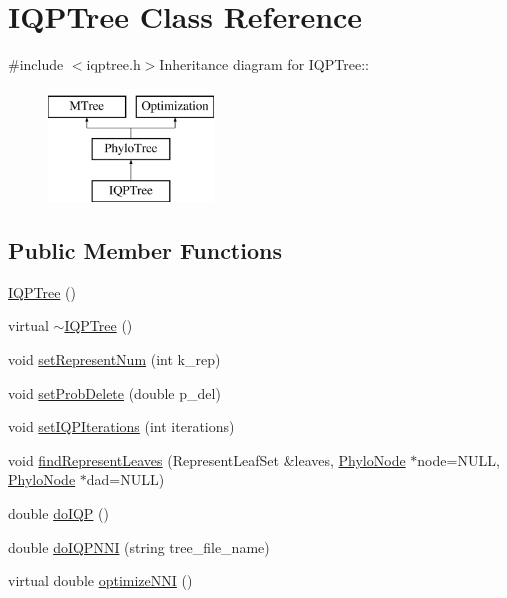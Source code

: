 \hypertarget{classIQPTree}{
\section{IQPTree Class Reference}
\label{classIQPTree}
}


{\ttfamily \#include $<$iqptree.h$>$}Inheritance diagram for IQPTree::\begin{figure}[H]
\begin{center}
\leavevmode
\includegraphics[height=3cm]{classIQPTree}
\end{center}
\end{figure}
\subsection*{Public Member Functions}
\begin{DoxyCompactItemize}
\item 
\hyperlink{classIQPTree_aa29641a82fd24a3023b527496b1d1903}{IQPTree} ()
\item 
virtual \hyperlink{classIQPTree_a35619d9f009df68327f7639ecded27f8}{$\sim$IQPTree} ()
\item 
void \hyperlink{classIQPTree_aa77b4949058eb92e6179f9cfab2330d1}{setRepresentNum} (int k\_\-rep)
\item 
void \hyperlink{classIQPTree_a94b43e66444d6f5d8f6fec75ff708add}{setProbDelete} (double p\_\-del)
\item 
void \hyperlink{classIQPTree_a8e837502069fdce36da52ac029b5f1ff}{setIQPIterations} (int iterations)
\item 
void \hyperlink{classIQPTree_a008a05f575902d53ca355452a8e63082}{findRepresentLeaves} (RepresentLeafSet \&leaves, \hyperlink{classPhyloNode}{PhyloNode} $\ast$node=NULL, \hyperlink{classPhyloNode}{PhyloNode} $\ast$dad=NULL)
\item 
double \hyperlink{classIQPTree_aa7d776139b6b10625fce6bc0cd33274d}{doIQP} ()
\item 
double \hyperlink{classIQPTree_af92cd63a37e644c51bb4006b07a32a53}{doIQPNNI} (string tree\_\-file\_\-name)
\item 
virtual double \hyperlink{classIQPTree_a8d1a63f976a3a219bc8a23ed356e1d65}{optimizeNNI} ()
\end{DoxyCompactItemize}
